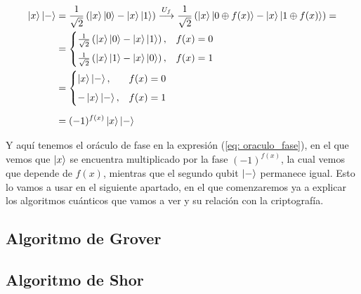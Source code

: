 \documentclass[12pt]{article}
\numberwithin{equation}{section} %
\begin{document}
    \begin{align}
        \ket{x} \ket{-} &= \frac{1}{\sqrt{2}} \left( \ket{x} \ket{0} - \ket{x} \ket{1} \right) \overset{U_{f}}{\longrightarrow} \frac{1}{\sqrt{2}} \left( \ket{x} \ket{0 \oplus f(x)} - \ket{x} \ket{1 \oplus f(x)} \right) = \nonumber \\
        &= \begin{cases}
            \frac{1}{\sqrt{2}} \left( \ket{x} \ket{0} - \ket{x} \ket{1} \right), & f(x) = 0 \\[5pt]
            \frac{1}{\sqrt{2}} \left( \ket{x} \ket{1} - \ket{x} \ket{0} \right), & f(x) = 1 
        \end{cases} \nonumber \\
        &= \begin{cases}
            \ket{x} \ket{-}, & f(x) = 0 \\[5pt]
            -\ket{x} \ket{-}, & f(x) = 1
        \end{cases} \nonumber \\[5pt]
        &= (-1)^{f(x)} \ket{x} \ket{-}
        \label{eq: oraculo_fase}
    \end{align}

    \vspace{2.5mm}

    Y aquí tenemos el oráculo de fase en la expresión (\ref{eq: oraculo_fase}), en el que vemos que \( \ket{x} \) se encuentra multiplicado por la fase \( (-1)^{f(x)} \), la cual vemos que depende de \( f(x) \), mientras que el segundo qubit \( \ket{-} \) permanece igual. Esto lo vamos a usar en el siguiente apartado, en el que comenzaremos ya a explicar los algoritmos cuánticos que vamos a ver y su relación con la criptografía. 

    \vspace{5mm}






    \subsection{Algoritmo de Grover}\label{subsection: algoritmo_grover}

    \vspace{5mm}

    

    \vspace{5mm}





    \subsection{Algoritmo de Shor}\label{subsection: algoritmo_shor}
\end{document}
